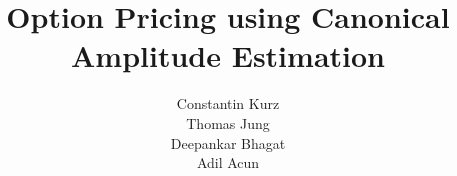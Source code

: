 \documentclass[a4paper, 12pt, one column, aas_macros]{article}
\title{Option Pricing using Canonical Amplitude Estimation}
\author{Constantin Kurz \\ Thomas Jung \\ Deepankar Bhagat \\ Adil Acun}
\def\biblio{}
\begin{document}
\def\biblio{}
\maketitle













\end{document}
